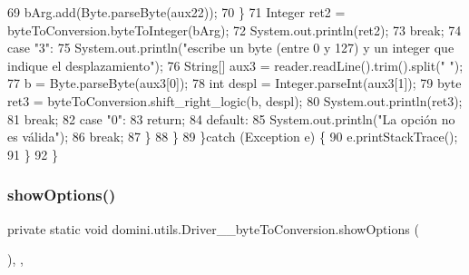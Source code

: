 \begin{DoxyCode}
69                         bArg.add(Byte.parseByte(aux22));
70                     \}
71                     Integer ret2 = byteToConversion.byteToInteger(bArg);
72                     System.out.println(ret2);
73                 \textcolor{keywordflow}{break};
74                 \textcolor{keywordflow}{case} \textcolor{stringliteral}{"3"}:
75                     System.out.println(\textcolor{stringliteral}{"escribe un byte (entre 0 y 127) y un integer que indique el
       desplazamiento"});
76                     String[] aux3 = reader.readLine().trim().split(\textcolor{stringliteral}{" "});
77                     b = Byte.parseByte(aux3[0]);
78                     \textcolor{keywordtype}{int} despl = Integer.parseInt(aux3[1]);
79                     byte ret3 = byteToConversion.shift\_right\_logic(b, despl);
80                     System.out.println(ret3);
81                 \textcolor{keywordflow}{break};
82                 \textcolor{keywordflow}{case} \textcolor{stringliteral}{"0"}:
83                     \textcolor{keywordflow}{return};
84                 \textcolor{keywordflow}{default}:
85                     System.out.println(\textcolor{stringliteral}{"La opción no es válida"});
86                 \textcolor{keywordflow}{break};
87             \}
88         \}
89     \}\textcolor{keywordflow}{catch} (Exception e) \{
90         e.printStackTrace();
91     \}
92     \}
\end{DoxyCode}
\mbox{\label{classdomini_1_1utils_1_1Driver____byteToConversion_a58412c0a63cc729003ca6d28bbc3b83b}} 
\subsubsection{\texorpdfstring{show\+Options()}{showOptions()}}
{\footnotesize\ttfamily private static void domini.\+utils.\+Driver\+\_\+\+\_\+byte\+To\+Conversion.\+show\+Options (\begin{DoxyParamCaption}{ }\end{DoxyParamCaption})\hspace{0.3cm}{\ttfamily [inline]}, {\ttfamily [static]}, {\ttfamily [private]}}



